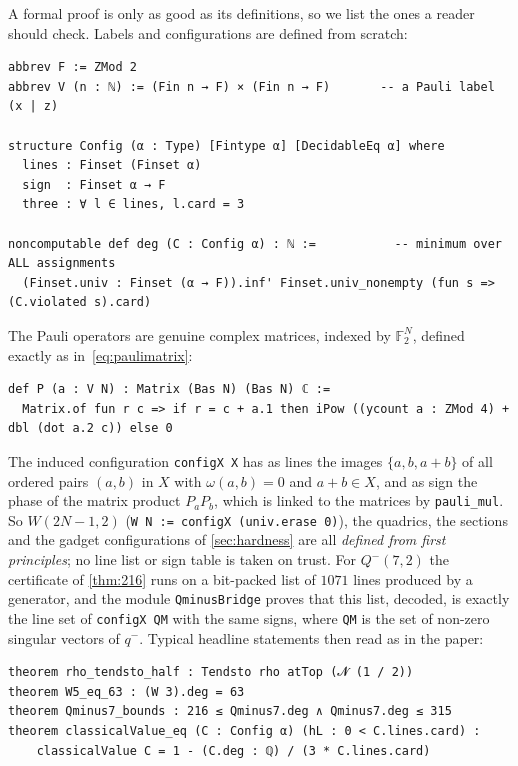\documentclass[a4paper,onecolumn,11pt,unpublished,nopdfoutputerror]{quantumarticle}
\theoremstyle{definition}
\newcommand{\lname}[1]{\texttt{\textcolor{leangreen}{#1}}}
\newcommand{\F}{\mathbb{F}_2}
\newcommand{\W}[1]{W(#1,2)}
\newcommand{\Qm}[1]{Q^{-}(#1,2)}
\begin{document}
A formal proof is only as good as its definitions, so we list the ones a reader should check. Labels and
configurations are defined from scratch:

\begin{lstlisting}
abbrev F := ZMod 2
abbrev V (n : ℕ) := (Fin n → F) × (Fin n → F)       -- a Pauli label (x | z)

structure Config (α : Type) [Fintype α] [DecidableEq α] where
  lines : Finset (Finset α)
  sign  : Finset α → F
  three : ∀ l ∈ lines, l.card = 3

noncomputable def deg (C : Config α) : ℕ :=           -- minimum over ALL assignments
  (Finset.univ : Finset (α → F)).inf' Finset.univ_nonempty (fun s => (C.violated s).card)
\end{lstlisting}

The Pauli operators are genuine complex matrices, indexed by $\F^N$, defined exactly as
in~\eqref{eq:paulimatrix}:

\begin{lstlisting}
def P (a : V N) : Matrix (Bas N) (Bas N) ℂ :=
  Matrix.of fun r c => if r = c + a.1 then iPow ((ycount a : ZMod 4) + dbl (dot a.2 c)) else 0
\end{lstlisting}

The induced configuration \texttt{configX X} has as lines the images $\{a,b,a+b\}$ of all ordered pairs $(a,b)$ in
$X$ with $\omega(a,b)=0$ and $a+b\in X$, and as sign the phase of the matrix product $P_aP_b$, which is linked to
the matrices by \lname{pauli\_mul}. So $\W{2N-1}$ (\lname{W N := configX (univ.erase 0)}), the quadrics, the
sections and the gadget configurations of \cref{sec:hardness} are all \emph{defined from first principles}; no
line list or sign table is taken on trust. For $\Qm7$ the certificate of \cref{thm:216} runs on a bit-packed list
of $1071$ lines produced by a generator, and the module \texttt{QminusBridge} proves that this list, decoded, is
exactly the line set of \lname{configX QM} with the same signs, where \lname{QM} is the set of non-zero singular
vectors of $q^-$. Typical headline statements then read as in the paper:

\begin{lstlisting}
theorem rho_tendsto_half : Tendsto rho atTop (𝓝 (1 / 2))
theorem W5_eq_63 : (W 3).deg = 63
theorem Qminus7_bounds : 216 ≤ Qminus7.deg ∧ Qminus7.deg ≤ 315
theorem classicalValue_eq (C : Config α) (hL : 0 < C.lines.card) :
    classicalValue C = 1 - (C.deg : ℚ) / (3 * C.lines.card)
\end{lstlisting}
\end{document}
